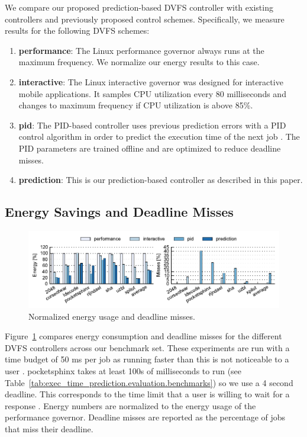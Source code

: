 We compare our proposed prediction-based DVFS controller with existing
controllers and previously proposed control schemes. Specifically, we measure
results for the following DVFS schemes:
\begin{enumerate}
  \item \textbf{performance}: The Linux performance governor
  \cite{linux_governors} always runs at the maximum frequency. We normalize our
  energy results to this case.
  \item \textbf{interactive}: The Linux interactive governor
  \cite{linux_governors} was designed for interactive mobile applications. It
  samples CPU utilization every 80 milliseconds and changes to maximum
  frequency if CPU utilization is above 85\%.
  \item \textbf{pid}: The PID-based controller uses previous prediction errors
  with a PID control algorithm in order to predict the execution time of the
  next job \cite{gu-dac08}. The PID parameters are trained offline and are
  optimized to reduce deadline misses.
  \item \textbf{prediction}: This is our prediction-based controller as
  described in this paper.
\end{enumerate}

\subsection{Energy Savings and Deadline Misses}

\begin{figure}
  \begin{center}
    \includegraphics{exec_time_prediction/data/em_summary.pdf}
    \caption{Normalized energy usage and deadline misses.}
    \label{fig:exec_time_prediction.evaluation.em_summary}
  \end{center}
\end{figure}

Figure~\ref{fig:exec_time_prediction.evaluation.em_summary} compares energy
consumption and deadline misses for the different DVFS controllers across our
benchmark set. These experiments are run with a time budget of 50 ms per job as
running faster than this is not noticeable to a user \cite{lindgaard-bit06,
eqos-hpca15}.  pocketsphinx takes at least 100s of milliseconds to run (see
Table~\ref{tab:exec_time_prediction.evaluation.benchmarks}) so we use a 4
second deadline. This corresponds to the time limit that a user is willing to
wait for a response \cite{miller-afips68}.  Energy numbers are normalized to
the energy usage of the performance governor.  Deadline misses are reported as
the percentage of jobs that miss their deadline. 

